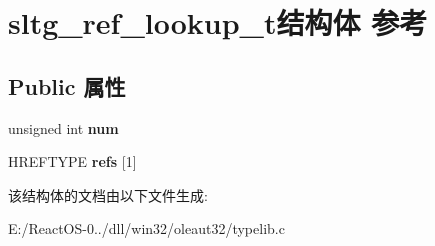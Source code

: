 \hypertarget{structsltg__ref__lookup__t}{}\section{sltg\+\_\+ref\+\_\+lookup\+\_\+t结构体 参考}
\label{structsltg__ref__lookup__t}
\subsection*{Public 属性}
\begin{DoxyCompactItemize}
\item 
\mbox{\label{structsltg__ref__lookup__t_ab5867d785fec443ae9afefe1d4186c9c}} 
unsigned int {\bfseries num}
\item 
\mbox{\label{structsltg__ref__lookup__t_a504e28d6ee7106dce3bf435fc654fc85}} 
H\+R\+E\+F\+T\+Y\+PE {\bfseries refs} \mbox{[}1\mbox{]}
\end{DoxyCompactItemize}


该结构体的文档由以下文件生成\+:\begin{DoxyCompactItemize}
\item 
E\+:/\+React\+O\+S-\/0../dll/win32/oleaut32/typelib.\+c\end{DoxyCompactItemize}
